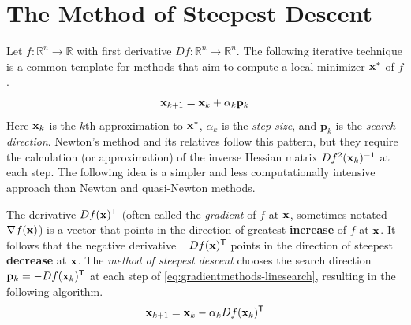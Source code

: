 
\section*{The Method of Steepest Descent} %

Let $f:\mathbb{R}^n \rightarrow \mathbb{R}$ with first derivative $Df:\mathbb{R}^n \rightarrow \mathbb{R}^n$.
The following iterative technique is a common template for methods that aim to compute a local minimizer $\mathbf{x}^*$ of $f$.
\begin{equation}
\mathbf{x}_{k+1} = \mathbf{x}_k + \alpha_{k}\mathbf{p}_k
\label{eq:gradientmethods-linesearch}
\end{equation}
Here $\mathbf{x}_k$ is the $k$th approximation to $\mathbf{x}^*$, $\alpha_k$ is the \emph{step size}, and $\mathbf{p}_k$ is the \emph{search direction}.
Newton's method and its relatives follow this pattern, but they require the calculation (or approximation) of the inverse Hessian matrix $Df^2(\mathbf{x}_k)^{-1}$ at each step.
The following idea is a simpler and less computationally intensive approach than Newton and quasi-Newton methods.

The derivative $Df(\mathbf{x})^{\mathsf T}$ (often called the \emph{gradient} of $f$ at $\mathbf{x}$, sometimes notated $\nabla f(\mathbf{x})$) is a vector that points in the direction of greatest \textbf{increase} of $f$ at $\mathbf{x}$.
It follows that the negative derivative $-Df(\mathbf{x})^{\mathsf T}$ points in the direction of steepest \textbf{decrease} at $\mathbf{x}$.
The \emph{method of steepest descent} chooses the search direction $\mathbf{p}_k = -Df(\mathbf{x}_k)^{\mathsf T}$ at each step of \eqref{eq:gradientmethods-linesearch}, resulting in the following algorithm.
\begin{equation}
\mathbf{x}_{k+1} = \mathbf{x}_k - \alpha_{k}Df(\mathbf{x}_k)^{\mathsf T}
\label{eq:gradientmethods-steepest-descent}
\end{equation}

